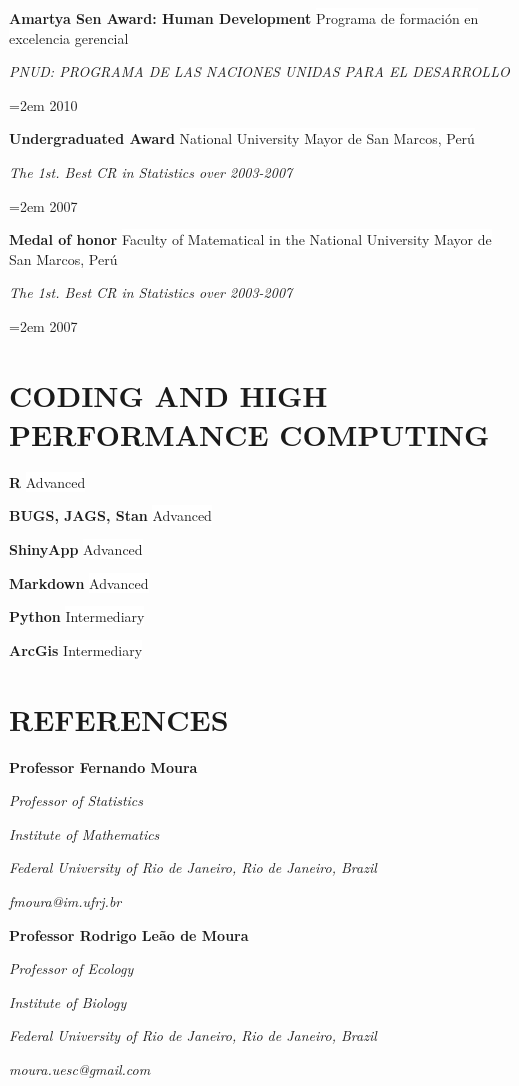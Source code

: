 \documentclass[paper=a4,fontsize=11pt]{scrartcl}	 			%
\newcommand{\sepspace}{\vspace*{1em}}			%
\newcommand{\NewPart}[1]{\section*{\uppercase{#1}}}
\newcommand{\EducationEntry}[4]{
		\noindent \textbf{#1} \hfill 					%
		\colorbox{White}{%
			\parbox{10em}{%
			\hfill\color{Black}#2}} \par				%
		\noindent \textit{#3} \par					%
		\noindent\hangindent=2em\hangafter=0 \small #4 	%
		\normalsize \par}
\newcommand{\WorkEntry}[4]{						%
		\noindent \textbf{#1} \hfill 					%
		\colorbox{White}{\color{Black}#2} \par		%
		\noindent \textit{#3} \par					%
		\noindent\hangindent=2em\hangafter=0 \small #4 	%
		\normalsize \par}
\newcommand{\RefEntry}[7]{						%
		\noindent \textbf{#1} \par 					%
		\noindent \textit{#2} \par	%
		\noindent \textit{#3} \par
		\noindent \textit{#4} \par%
		\noindent \textit{#5} \par
		\noindent \textit{#6} \par
		\noindent \textit{#7} \par}
\newcommand{\codeEntry}[2]{						%
		\noindent \textbf{#1} \hfill 					%
		\colorbox{White}{\color{Black}#2} \par		%
		}
\begin{document}
\WorkEntry{Amartya Sen Award: Human Development}{Programa de formaci\'{o}n en excelencia gerencial}{PNUD: PROGRAMA DE LAS NACIONES UNIDAS PARA EL DESARROLLO}{2010}
\sepspace

\WorkEntry{Undergraduated Award}{National University Mayor de San Marcos, Per\'{u}}{The 1st. Best CR in Statistics over 2003-2007}{2007}
\sepspace

\WorkEntry{Medal of honor}{Faculty of Matematical in the National University Mayor de San Marcos, Per\'{u}}{The 1st. Best CR in Statistics over 2003-2007}{2007}
\sepspace

\NewPart{Coding and High Performance Computing}
\codeEntry{R}{Advanced}
\codeEntry{BUGS, JAGS, Stan}{Advanced}
\codeEntry{ShinyApp}{Advanced}
\codeEntry{Markdown}{Advanced}
\codeEntry{Python}{Intermediary}
\codeEntry{ArcGis}{Intermediary}




\NewPart{References}



\RefEntry{Professor Fernando Moura}
{Professor of Statistics}
{Institute of Mathematics}
{Federal University of Rio de Janeiro, Rio de Janeiro, Brazil}
{fmoura@im.ufrj.br}
{}
{}

\RefEntry{Professor Rodrigo Le\~{a}o de Moura}
{Professor of Ecology}
{Institute of Biology}
{Federal University of Rio de Janeiro, Rio de Janeiro, Brazil}
{moura.uesc@gmail.com}
{}
{}



\end{document}
